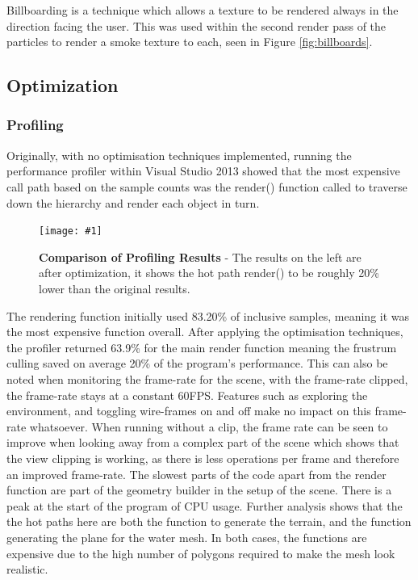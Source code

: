\documentclass[conference]{acmsiggraph}
\newcommand{\figuremacroW}[4]{
\begin{figure}[h] %
	\centering
	\texttt{[image: \#1]}
	\caption[#2]{\textbf{#2} - #3}
	\label{fig:#1}
\end{figure}
}
\begin{document}
Billboarding is a technique which allows a texture to be rendered always in the direction facing the user. This was used within the second render pass of the particles to render a smoke texture to each, seen in Figure \ref{fig:billboards}.
 
	
\subsection{Optimization}
	
\subsubsection{Profiling}
Originally, with no optimisation techniques implemented, running the performance profiler within Visual Studio 2013 showed that the most expensive call path based on the sample counts was the render() function called to traverse down the hierarchy and render each object in turn.
	
\figuremacroW	
{compare}
{Comparison of Profiling Results}
{The results on the left are after optimization, it shows the hot path render() to be roughly 20\% lower than the original results.}
{1.0}
	
The rendering function initially used 83.20\% of inclusive samples, meaning it was the most expensive function overall. After applying the optimisation techniques, the profiler returned 63.9\% for the main render function meaning the frustrum culling saved on average 20\% of the program's performance. This can also be noted when monitoring the frame-rate for the scene, with the frame-rate clipped, the frame-rate stays at a constant 60FPS. Features such as exploring the environment, and toggling wire-frames on and off make no impact on this frame-rate whatsoever. When running without a clip, the frame rate can be seen to improve when looking away from a complex part of the scene which shows that the view clipping is working, as there is less operations per frame and therefore an improved frame-rate. The slowest parts of the code apart from the render function are part of the geometry builder in the setup of the scene. There is a peak at the start of the program of CPU usage. Further analysis shows that the the hot paths here are both the function to generate the terrain, and the function generating the plane for the water mesh. In both cases, the functions are expensive due to the high number of polygons required to make the mesh look realistic. 
	
	
\end{document}
